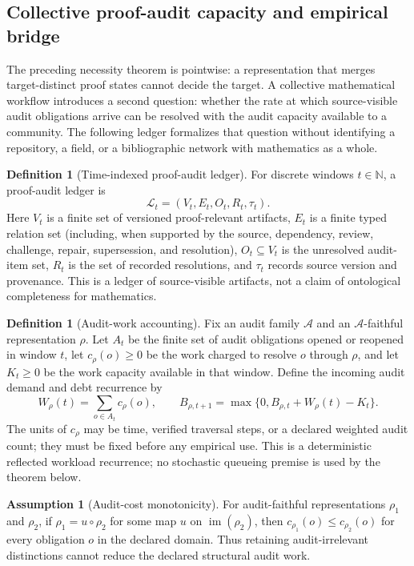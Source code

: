 \documentclass[11pt]{article}
\newcommand{\Ledger}{\ensuremath{\mathscr L}}
\newcommand{\Debt}{\ensuremath{B}}
\newcommand{\Demand}{\ensuremath{W}}
\newcommand{\AuditCap}{\ensuremath{K}}
\theoremstyle{plain}
\theoremstyle{definition}
\newtheorem{definition}[theorem]{Definition}
\newtheorem{assumption}[theorem]{Assumption}
\theoremstyle{remark}
\begin{document}
\subsection{Collective proof-audit capacity and empirical bridge}
\label{sec:capacity-v10}

The preceding necessity theorem is pointwise: a representation that merges
target-distinct proof states cannot decide the target.  A collective mathematical
workflow introduces a second question: whether the rate at which source-visible
audit obligations arrive can be resolved with the audit capacity available to a
community.  The following ledger formalizes that question without identifying a
repository, a field, or a bibliographic network with mathematics as a whole.

\begin{definition}[Time-indexed proof-audit ledger]
\label{def:ledger-v10}
For discrete windows $t\in\mathbb N$, a proof-audit ledger is
\[
  \Ledger_t=(V_t,E_t,O_t,R_t,\tau_t).
\]
Here $V_t$ is a finite set of versioned proof-relevant artifacts, $E_t$ is a
finite typed relation set (including, when supported by the source, dependency,
review, challenge, repair, supersession, and resolution), $O_t\subseteq V_t$ is
the unresolved audit-item set, $R_t$ is the set of recorded resolutions, and
$\tau_t$ records source version and provenance.  This is a ledger of
source-visible artifacts, not a claim of ontological completeness for
mathematics.
\end{definition}

\begin{definition}[Audit-work accounting]
\label{def:work-v10}
Fix an audit family $\mathcal A$ and an $\mathcal A$-faithful representation
$\rho$.  Let $A_t$ be the finite set of audit obligations opened or reopened in
window $t$, let $c_\rho(o)\geq 0$ be the work charged to resolve $o$ through
$\rho$, and let $\AuditCap_t\geq0$ be the work capacity available in that window.
Define the incoming audit demand and debt recurrence by
\[
 \Demand_\rho(t)=\sum_{o\in A_t}c_\rho(o),\qquad
 \Debt_{\rho,t+1}=\max\{0,\Debt_{\rho,t}+\Demand_\rho(t)-\AuditCap_t\}.
\]
The units of $c_\rho$ may be time, verified traversal steps, or a declared
weighted audit count; they must be fixed before any empirical use.  This is a
deterministic reflected workload recurrence; no stochastic queueing premise is
used by the theorem below.
\end{definition}

\begin{assumption}[Audit-cost monotonicity]
\label{ass:cost-v10}
For audit-faithful representations $\rho_1$ and $\rho_2$, if
$\rho_1=u\circ\rho_2$ for some map $u$ on $\operatorname{im}(\rho_2)$, then
$c_{\rho_1}(o)\leq c_{\rho_2}(o)$ for every obligation $o$ in the declared
domain.  Thus retaining audit-irrelevant distinctions cannot reduce the declared
structural audit work.
\end{assumption}
\end{document}
